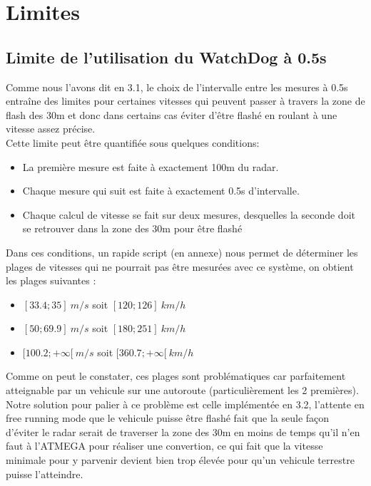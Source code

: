 \documentclass[a4paper, 12pt]{article}
\begin{document}
		\section{Limites}
		\subsection{Limite de l'utilisation du WatchDog à 0.5s}
		Comme nous l'avons dit en 3.1, le choix de l'intervalle entre les mesures à 0.5s entraîne des limites pour certaines vitesses qui peuvent passer à travers la zone de flash des 30m et donc dans certains cas éviter d'être flashé en roulant à une vitesse assez précise.\\
		Cette limite peut être quantifiée sous quelques conditions:
		\begin{itemize}
			\item La première mesure est faite à exactement 100m du radar.
			\item Chaque mesure qui suit est faite à exactement 0.5s d'intervalle.
			\item Chaque calcul de vitesse se fait sur deux mesures, desquelles la seconde doit se retrouver dans la zone des 30m pour être flashé
		\end{itemize}
		Dans ces conditions, un rapide script (en annexe) nous permet de déterminer les plages de vitesses qui ne pourrait pas être mesurées avec ce système, on obtient les plages suivantes :
		\begin{itemize}
			\item $[33.4;35]\ m/s$ soit $[120;126]\ km/h$
			\item $[50;69.9]\ m/s$ soit $[180;251]\ km/h$
			\item $[100.2;+\infty[\ m/s$ soit $[360.7;+\infty[\ km/h$
		\end{itemize}
		Comme on peut le constater, ces plages sont problématiques car parfaitement atteignable par un vehicule sur une autoroute (particulièrement les 2 premières). Notre solution pour palier à ce problème est celle implémentée en 3.2, l'attente en free running mode que le vehicule puisse être flashé fait que la seule façon d'éviter le radar serait de traverser la zone des 30m en moins de temps qu'il n'en faut à l'ATMEGA pour réaliser une convertion, ce qui fait que la vitesse minimale pour y parvenir devient bien trop élevée pour qu'un vehicule terrestre puisse l'atteindre.
	
\end{document}
